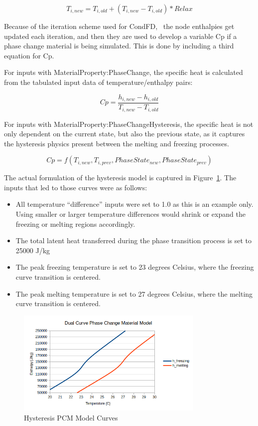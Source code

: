 \begin{equation}
{T_{i,new}} = {T_{i,old}} + \left( {{T_{i,new}} - {T_{i,old}}} \right)*Relax
\end{equation}

Because of the iteration scheme used for CondFD,~ the node enthalpies get updated each iteration, and then they are used to develop a variable Cp if a phase change material is being simulated. This is done by including a third equation for Cp.

For inputs with MaterialProperty:PhaseChange, the specific heat is calculated from the tabulated input data of temperature/enthalpy pairs:

\begin{equation}
Cp = \frac{{{h_{i,new}} - {h_{i,old}}}}{{{T_{i,new}} - {T_{i,old}}}}
\end{equation}

For inputs with MaterialProperty:PhaseChangeHysteresis, the specific heat is not only dependent on the current state, but also the previous state, as it captures the hysteresis physics present between the melting and freezing processes.

\begin{equation}
Cp = f\left(T_{i,new}, T_{i, prev}, PhaseState_{new}, PhaseState_{prev}\right)
\end{equation}

The actual formulation of the hysteresis model is captured in Figure~\ref{fig:PCMHysteresis}.  The inputs that led to those curves were as follows:

\begin{itemize}
\item
  All temperature ``difference'' inputs were set to 1.0 as this is an example only.  Using smaller or larger temperature differences would shrink or expand the freezing or melting regions accordingly.
\item
  The total latent heat transferred during the phase transition process is set to 25000 J/kg
\item
  The peak freezing temperature is set to 23 degrees Celsius, where the freezing curve transition is centered.
\item
  The peak melting temperature is set to 27 degrees Celsius, where the melting curve transition is centered.
\end{itemize}

\begin{figure}
  \centering
  \label{fig:PCMHysteresis}
  \includegraphics[width=0.8\textwidth]{media/PCMModel.png}
  \caption{Hysteresis PCM Model Curves}
\end{figure}

